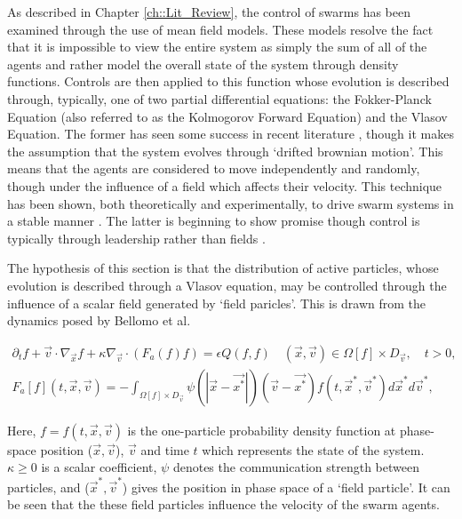 \documentclass[.../main.tex]{subfiles}
\begin{document}
    As described in Chapter \ref{ch::Lit_Review}, the control of swarms has been examined through the
    use of
    mean field models. These models resolve the fact that it is impossible to view the entire system
    as simply the sum of all of the agents and rather model the overall state of the system through
    density functions. Controls are then applied to this function whose evolution is described
    through, typically, one of two partial differential equations: the Fokker-Planck Equation (also
    referred to as the Kolmogorov Forward Equation) and the Vlasov Equation. The former has seen
    some success in recent literature \cite{Elamvazhuthi2019, Li2017,
    Roy2017}, though it makes the assumption that the system evolves through `drifted
    brownian motion'. This means that the agents are considered to move independently and
    randomly, though under the influence of a field which affects their velocity. This technique
	has been shown, both theoretically and experimentally, to drive swarm systems in a stable
	manner \cite{Fleig}. The latter is beginning to show promise 
	though control is typically through leadership rather than fields \cite{Burger2019}. 

	The hypothesis of this section is that the distribution of active particles, whose evolution is
	described through a Vlasov equation, may be controlled through the influence of a scalar field
	generated by `field paricles'. This is drawn from the dynamics posed by Bellomo et al. 
	\cite{Bellomo2017}

	\begin{equation}
	\label{eqn::Vlasov}
    \begin{split}    
        \partial_t f + \Vec{v} \cdot \nabla_{\Vec{x}} f + \kappa \nabla_{\Vec{v}} \cdot (F_a (f) f)
        = \epsilon Q(f, f) \quad  (\Vec{x}, \Vec{v}) \in \Omega[f] \times D_{\Vec{v}}, \quad t>0, \\
        F_a[f](t, \Vec{x}, \Vec{v}) = - \int_{\Omega [f] \times D_{\Vec{v}}} \psi (|\Vec{x} - \Vec
        {x^*}|)(\Vec{v} - \Vec{x^*}) f(t, \Vec{x}^*, \Vec{v}^*) d\Vec{x}^* d\Vec{v}^*, 
    \end{split}
    \end{equation}


    Here, $f = f(t, \Vec{x}, \Vec{v})$ is the one-particle probability density function at
    phase-space position ($\Vec{x}, \Vec{v}$), $\Vec{v}$ and time $t$ which represents the state of
    the system. $\kappa \geq 0$ is a scalar
    coefficient, $\psi$ denotes the communication strength between particles, and ($\Vec{x}^*, \Vec
    {v}^*$) gives the position in phase space of a `field particle'. It can be seen that the these
    field particles influence the velocity of the swarm agents.
\end{document}
